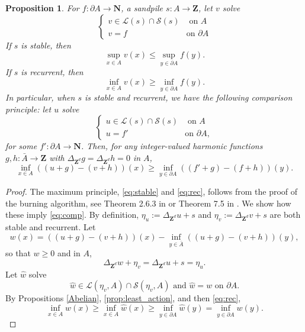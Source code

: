 \documentclass[12pt]{amsart}
\newcommand{\Z}{\mathbf{Z}}
\newcommand{\N}{\mathbf{N}}
\newtheorem{prop}{Proposition}[section]
\begin{document}
\begin{prop}\label{burning}
For $f: \partial A \to \N$, a sandpile $s: A \to \Z$, let $v$ solve
\[
\begin{cases}
v \in \mathcal{L}(s) \cap \mathcal{S}(s)  &\mbox{ on $A$} \\
v = f & \mbox{on $\partial A$} 
\end{cases}
\]
If $s$ is stable, then
\begin{equation} \label{eq:stable}
\sup_{x \in A} v(x) \leq \sup_{y \in \partial A} f(y). 
\end{equation}
If $s$ is recurrent, then
\begin{equation} \label{eq:rec}
\inf_{x \in A} v(x) \geq \inf_{y \in \partial A} f(y). 
\end{equation}
In particular, when $s$ is stable and recurrent, we have the following comparison principle: 
let $u$ solve
\[
\begin{cases}
u \in \mathcal{L}(s) \cap \mathcal{S}(s)  &\mbox{ on $A$} \\
u = f' & \mbox{on $\partial A$}, 
\end{cases}
\]
for some $f': \partial A \to \N$.
Then, for any integer-valued harmonic functions $g, h : \bar{A} \to \Z$ with $\Delta_{\Z^d} g = \Delta_{\Z^d} h = 0$ in $A$, 
\begin{equation} \label{eq:comp}
\inf_{x \in A} ( (u + g) - (v + h) )(x) \geq \inf_{y \in \partial A} ( (f'+g) - (f + h))(y). 
\end{equation}
\end{prop}

\begin{proof}
	The maximum principle, \eqref{eq:stable} and \eqref{eq:rec}, follows from the proof of the burning algorithm, see Theorem 2.6.3 in \cite{klivans2018mathematics} or Theorem 7.5 in \cite{corry2018divisors}.  We show how these imply \eqref{eq:comp}.  By definition, $\eta_u := \Delta_{\Z^d} u + s$ and $\eta_v := \Delta_{\Z^d} v + s$ 
	are both stable and recurrent. Let 
	\[
	w(x) =  ( (u + g) - (v + h) )(x) - \inf_{y \in \bar{A}} ( (u + g) - (v + h) )(y), 
	\]
	so that $w \geq 0$ and in $A$, 
	\[
	\Delta_{\Z^d} w + \eta_v = \Delta_{\Z^d} u + s = \eta_u. 
	\]
	Let $\hat{w}$ solve 
	\[
 	\hat{w} \in \mathcal{L}(\eta_v, A) \cap \mathcal{S}(\eta_v, A) \mbox{ and $\hat{w} = w$ on $\partial A$}.
	\]
	By Propositions \ref{Abelian}, \ref{prop:least_action}, and then \eqref{eq:rec}, 
	\[
	\inf_{x \in A} w(x) \geq \inf_{x \in A} \hat{w}(x) \geq \inf_{y \in \partial A} \hat{w}(y) = \inf_{y \in \partial A} w(y).
	\]
\end{proof}
\end{document}
